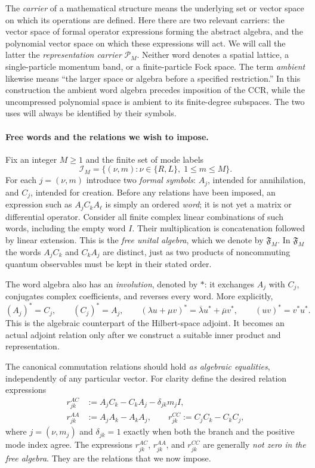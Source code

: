 The \emph{carrier} of a mathematical structure means the underlying set or
vector space on which its operations are defined.  Here there are two
relevant carriers: the vector space of formal operator expressions forming
the abstract algebra, and the polynomial vector space on which these
expressions will act.  We will call the latter the \emph{representation
carrier} $\mathcal P_M$.  Neither word denotes a spatial lattice, a
single-particle momentum band, or a finite-particle Fock space.  The term
\emph{ambient} likewise means ``the larger space or algebra before a
specified restriction.''  In this construction the ambient word algebra
precedes imposition of the CCR, while the uncompressed polynomial space is
ambient to its finite-degree subspaces.  The two uses will always be
identified by their symbols.

\paragraph{Free words and the relations we wish to impose.}
Fix an integer $M\geq1$ and the finite set of mode labels
\[
  \mathcal I_M=\{(\nu,m):\nu\in\{R,L\},\;1\leq m\leq M\}.
\]
For each $j=(\nu,m)$ introduce two \emph{formal symbols}: $A_j$, intended
for annihilation, and $C_j$, intended for creation.  Before any relations
have been imposed, an expression such as $A_j C_k A_\ell$ is simply an
ordered \emph{word}; it is not yet a matrix or differential operator.
Consider all finite complex linear combinations of such words, including
the empty word $I$.  Their multiplication is concatenation followed by
linear extension.  This is the \emph{free unital algebra}, which we denote
by $\mathfrak F_M$.  In $\mathfrak F_M$ the words $A_jC_k$ and $C_kA_j$
are distinct, just as two products of noncommuting quantum observables
must be kept in their stated order.

The word algebra also has an \emph{involution}, denoted by $*$: it exchanges
$A_j$ with $C_j$, conjugates complex coefficients, and reverses every
word.  More explicitly,
\begin{equation}
 (A_j)^*=C_j,\qquad (C_j)^*=A_j,\qquad
 (\lambda u+\mu v)^*=\overline\lambda u^*+
       \overline\mu v^*,\qquad (uv)^*=v^*u^*.
 \label{eq:ch19-free-star}
\end{equation}
This is the algebraic counterpart of the Hilbert-space adjoint.  It becomes
an actual adjoint relation only after we construct a suitable inner product
and representation.

The canonical commutation relations should hold \emph{as algebraic
equalities}, independently of any particular vector.  For clarity define
the desired relation expressions
\begin{align}
 r^{AC}_{jk}&:=A_jC_k-C_kA_j-\delta_{jk}m_j I,\nonumber\\
 r^{AA}_{jk}&:=A_jA_k-A_kA_j,\qquad
 r^{CC}_{jk}:=C_jC_k-C_kC_j,
 \label{eq:ch19-relation-expressions}
\end{align}
where $j=(\nu,m_j)$ and $\delta_{jk}=1$ exactly when both the branch and
the positive mode index agree.  The expressions $r^{AC}_{jk}$,
$r^{AA}_{jk}$, and $r^{CC}_{jk}$ are generally \emph{not zero in the
free algebra}.  They are the relations that we now impose.


